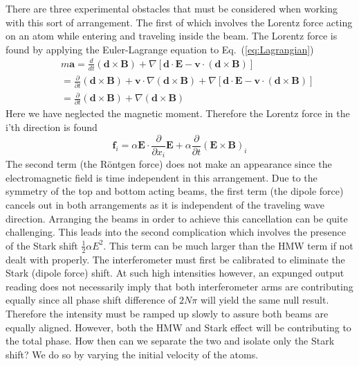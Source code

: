 \documentclass[twocolumn,english,pra,aps,superscriptaddress,floatfix]{revtex4-1}
\begin{document}
There are three experimental obstacles that must be considered when working with this sort of arrangement.  The first of which involves the Lorentz force acting on an atom while entering and traveling inside the beam.  The Lorentz force is found by applying the Euler-Lagrange equation to Eq.\ (\ref{eq:Lagrangian})
\begin{eqnarray}
&&m\mathbf{a}=\frac{d}{dt}\left(\mathbf{d}\times\mathbf{B}\right)+\nabla\left[\mathbf{d}\cdot\mathbf{E}-\mathbf{v}\cdot\left(\mathbf{d}\times\mathbf{B}\right)\right] \nonumber \\
&&=\frac{\partial}{\partial t}\left(\mathbf{d}\times\mathbf{B}\right)+\mathbf{v}\cdot\nabla\left(\mathbf{d}\times\mathbf{B}\right)+\nabla\left[\mathbf{d}\cdot\mathbf{E}-\mathbf{v}\cdot\left(\mathbf{d}\times\mathbf{B}\right)\right] \nonumber \\
&&=\frac{\partial}{\partial t}\left(\mathbf{d}\times\mathbf{B}\right)+\nabla\left(\mathbf{d}\times\mathbf{B}\right)
\end{eqnarray}
Here we have neglected the magnetic moment. Therefore the Lorentz force in the i'th direction is found
\begin{equation}
\mathbf{f}_i= \alpha\mathbf{E}\cdot\frac{\partial}{\partial x_i}\mathbf{E}+\alpha\frac{\partial}{\partial t}\left(\mathbf{E}\times\mathbf{B}\right)_i
\label{lorentz4}
\end{equation}
The second term (the R\"{o}ntgen force) does not make an appearance since the electromagnetic field is time independent in this arrangement. 
Due to the symmetry of the top and bottom acting beams, the first term (the dipole force) cancels out in both arrangements as it is independent of the traveling wave direction.  Arranging the beams in order to achieve this cancellation can be quite challenging. This leads into the second complication which involves the presence of the Stark shift $\frac{1}{2}\alpha E^2$.  This term can be much larger than the HMW term if not dealt with properly.  The interferometer must first be calibrated to eliminate the Stark (dipole force) shift.  At such high intensities however, an expunged output reading does not necessarily imply that both interferometer arms are contributing equally since all phase shift difference of $2N\pi$ will yield the same null result.  Therefore the intensity must be ramped up slowly to assure both beams are equally aligned.  However, both the HMW and Stark effect will be contributing to the total phase.  How then can we separate the two and isolate only the Stark shift?  We do so by varying the initial velocity of the atoms.
\end{document}
